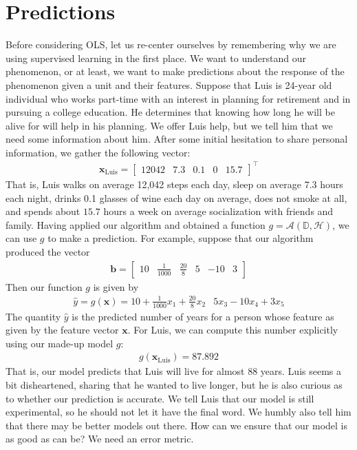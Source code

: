 \documentclass[12pt]{article}
\begin{document}
	\section{Predictions}
	Before considering OLS, let us re-center ourselves by remembering why
	we are using supervised learning in the first place. We want to understand
	our phenomenon, or at least, we want to make predictions about the response
	of the phenomenon given a unit and their features. Suppose that Luis
	is 24-year old individual who works part-time with an interest in planning
	for retirement and in pursuing a college education. He determines that knowing how
	long he will be alive for will help in his planning. We offer Luis help, but we tell
	him that we need some information about him. After some initial hesitation to share
	personal information, we gather the following vector:
	\begin{align*}
		\bm{x}_{\text{Luis}} = \begin{bmatrix}
			12042 & 7.3 & 0.1 & 0 & 15.7
		\end{bmatrix}^\top
	\end{align*}
	That is, Luis walks on average 12,042 steps each day, sleep on average 7.3 hours
	each night, drinks 0.1 glasses of wine each day on average, does not smoke at all, and
	spends about $15.7$ hours a week on average socialization with friends and family.
	Having applied our algorithm and obtained a function $g=\mathcal{A}(\mathbb{D}, \mathcal{H})$,
	we can use $g$ to make a prediction. For example, suppose that our algorithm
	produced the vector
	\begin{align*}
		\bm{b} = \begin{bmatrix}
			10 & \frac{1}{1000} & \frac{20}{8} & 5 & -10 & 3
		\end{bmatrix}
	\end{align*}
	Then our function $g$ is given by
	\begin{align*}
		\hat{y} = g(\bm{x}) = 10 + \frac{1}{1000}x_1 + \frac{20}{8}x_2 & 5x_3 - 10x_4 + 3x_5
	\end{align*}
	The quantity $\hat{y}$ is the predicted number of years for a person
	whose feature as given by the feature vector $\bm{x}$. For Luis, we
	can compute this number explicitly using our made-up model $g$:
	\begin{align*}
		g(\bm{x}_{\text{Luis}}) = 87.892
	\end{align*}
	That is, our model predicts that Luis will live for almost $88$ years.
	Luis seems a bit disheartened, sharing that he wanted to live longer,
	but he is also curious as to whether our prediction is accurate. We tell
	Luis that our model is still experimental, so he should not let it have
	the final word. We humbly also tell him that there may be better models out
	there. How can we ensure that our model is as good as can be? We need
	an error metric.
\end{document}
